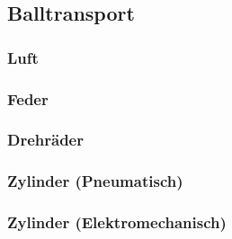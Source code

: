 \subsection{Balltransport}

\subsubsection{Luft}

\subsubsection{Feder}

\subsubsection{Drehräder}

\subsubsection{Zylinder (Pneumatisch)}

\subsubsection{Zylinder (Elektromechanisch)}